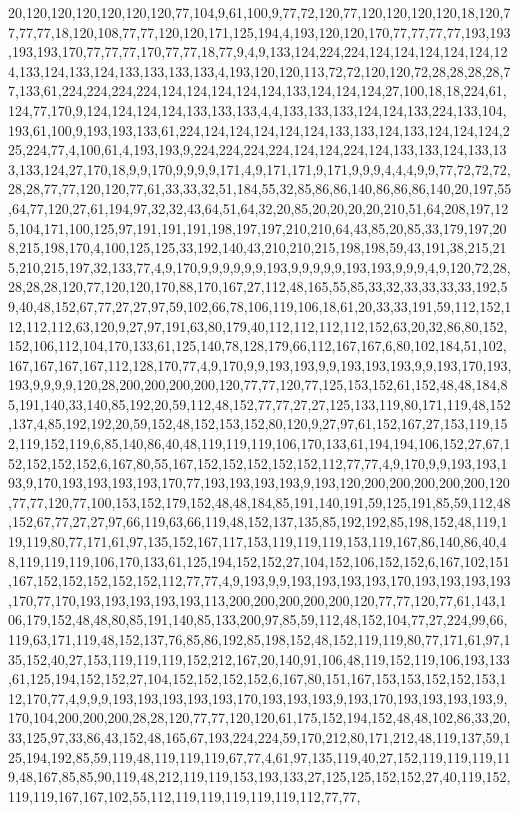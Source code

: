 20,120,120,120,120,120,120,77,104,9,61,100,9,77,72,120,77,120,120,120,120,18,120,77,77,77,18,120,108,77,77,120,120,171,125,194,4,193,120,120,170,77,77,77,77,193,193,193,193,170,77,77,77,170,77,77,18,77,9,4,9,133,124,224,224,124,124,124,124,124,124,133,124,133,124,133,133,133,133,4,193,120,120,113,72,72,120,120,72,28,28,28,28,77,133,61,224,224,224,224,124,124,124,124,124,133,124,124,124,27,100,18,18,224,61,124,77,170,9,124,124,124,124,133,133,133,4,4,133,133,133,124,124,133,224,133,104,193,61,100,9,193,193,133,61,224,124,124,124,124,124,133,133,124,133,124,124,124,225,224,77,4,100,61,4,193,193,9,224,224,224,224,124,124,224,124,133,133,124,133,133,133,124,27,170,18,9,9,170,9,9,9,9,171,4,9,171,171,9,171,9,9,9,4,4,4,9,9,77,72,72,72,28,28,77,77,120,120,77,61,33,33,32,51,184,55,32,85,86,86,140,86,86,86,140,20,197,55,64,77,120,27,61,194,97,32,32,43,64,51,64,32,20,85,20,20,20,20,210,51,64,208,197,125,104,171,100,125,97,191,191,191,198,197,197,210,210,64,43,85,20,85,33,179,197,208,215,198,170,4,100,125,125,33,192,140,43,210,210,215,198,198,59,43,191,38,215,215,210,215,197,32,133,77,4,9,170,9,9,9,9,9,9,193,9,9,9,9,9,193,193,9,9,9,4,9,120,72,28,28,28,28,120,77,120,120,170,88,170,167,27,112,48,165,55,85,33,32,33,33,33,33,192,59,40,48,152,67,77,27,27,97,59,102,66,78,106,119,106,18,61,20,33,33,191,59,112,152,112,112,112,63,120,9,27,97,191,63,80,179,40,112,112,112,112,152,63,20,32,86,80,152,152,106,112,104,170,133,61,125,140,78,128,179,66,112,167,167,6,80,102,184,51,102,167,167,167,167,112,128,170,77,4,9,170,9,9,193,193,9,9,193,193,193,9,9,193,170,193,193,9,9,9,9,120,28,200,200,200,200,120,77,77,120,77,125,153,152,61,152,48,48,184,85,191,140,33,140,85,192,20,59,112,48,152,77,77,27,27,125,133,119,80,171,119,48,152,137,4,85,192,192,20,59,152,48,152,153,152,80,120,9,27,97,61,152,167,27,153,119,152,119,152,119,6,85,140,86,40,48,119,119,119,106,170,133,61,194,194,106,152,27,67,152,152,152,152,6,167,80,55,167,152,152,152,152,152,112,77,77,4,9,170,9,9,193,193,193,9,170,193,193,193,193,170,77,193,193,193,193,9,193,120,200,200,200,200,200,120,77,77,120,77,100,153,152,179,152,48,48,184,85,191,140,191,59,125,191,85,59,112,48,152,67,77,27,27,97,66,119,63,66,119,48,152,137,135,85,192,192,85,198,152,48,119,119,119,80,77,171,61,97,135,152,167,117,153,119,119,119,153,119,167,86,140,86,40,48,119,119,119,106,170,133,61,125,194,152,152,27,104,152,106,152,152,6,167,102,151,167,152,152,152,152,152,112,77,77,4,9,193,9,9,193,193,193,193,170,193,193,193,193,170,77,170,193,193,193,193,193,113,200,200,200,200,200,120,77,77,120,77,61,143,106,179,152,48,48,80,85,191,140,85,133,200,97,85,59,112,48,152,104,77,27,224,99,66,119,63,171,119,48,152,137,76,85,86,192,85,198,152,48,152,119,119,80,77,171,61,97,135,152,40,27,153,119,119,119,152,212,167,20,140,91,106,48,119,152,119,106,193,133,61,125,194,152,152,27,104,152,152,152,152,6,167,80,151,167,153,153,152,152,153,112,170,77,4,9,9,9,193,193,193,193,193,170,193,193,193,9,193,170,193,193,193,193,9,170,104,200,200,200,28,28,120,77,77,120,120,61,175,152,194,152,48,48,102,86,33,20,33,125,97,33,86,43,152,48,165,67,193,224,224,59,170,212,80,171,212,48,119,137,59,125,194,192,85,59,119,48,119,119,119,67,77,4,61,97,135,119,40,27,152,119,119,119,119,48,167,85,85,90,119,48,212,119,119,153,193,133,27,125,125,152,152,27,40,119,152,119,119,167,167,102,55,112,119,119,119,119,119,112,77,77,